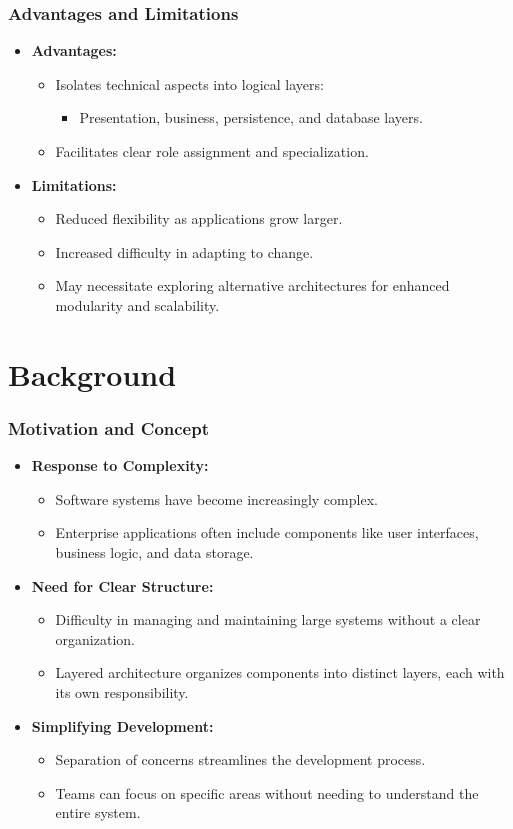 \documentclass[aspectratio=169, table]{beamer}
\begin{document}
	\begin{frame}
		\frametitle{Advantages and Limitations}
		\begin{itemize}
			\item \textbf{Advantages:}
			\begin{itemize}
				\item Isolates technical aspects into logical layers:
				\begin{itemize}
					\item Presentation, business, persistence, and database layers.
				\end{itemize}
				\item Facilitates clear role assignment and specialization.
			\end{itemize}
			\item \textbf{Limitations:}
			\begin{itemize}
				\item Reduced flexibility as applications grow larger.
				\item Increased difficulty in adapting to change.
				\item May necessitate exploring alternative architectures for enhanced modularity and scalability.
			\end{itemize}
		\end{itemize}
	\end{frame}

\section{Background}

\begin{frame}
	\frametitle{Motivation and Concept}
	\begin{itemize}
		\item \textbf{Response to Complexity:}
		\begin{itemize}
			\item Software systems have become increasingly complex.
			\item Enterprise applications often include components like user interfaces, business logic, and data storage.
		\end{itemize}
		\item \textbf{Need for Clear Structure:}
		\begin{itemize}
			\item Difficulty in managing and maintaining large systems without a clear organization.
			\item Layered architecture organizes components into distinct layers, each with its own responsibility.
		\end{itemize}
		\item \textbf{Simplifying Development:}
		\begin{itemize}
			\item Separation of concerns streamlines the development process.
			\item Teams can focus on specific areas without needing to understand the entire system.
		\end{itemize}
	\end{itemize}
\end{frame}
\end{document}
